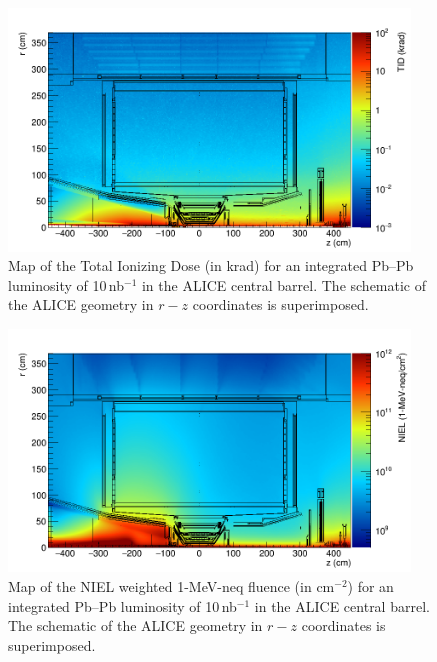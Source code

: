 \begin{figure}[t]
\centering
\includegraphics[width=0.95\textwidth]{figures/SensorSimulation/dose2.png}	
\caption{Map of the Total Ionizing Dose (in krad) for an integrated Pb--Pb luminosity of 10\,nb$^{-1}$ in the ALICE central barrel. The schematic of the ALICE geometry in $r-z$ coordinates is superimposed.}
\label{dose} 
\end{figure}

\begin{figure}[H]
\centering
\includegraphics[width=0.95\textwidth]{figures/SensorSimulation/nequ2.png}	
\caption{Map of the NIEL weighted 1-MeV-neq fluence (in cm$^{-2}$) for an integrated Pb--Pb luminosity of 10\,nb$^{-1}$ in the ALICE central barrel. The schematic of the ALICE geometry in $r-z$ coordinates is superimposed.}
\label{neq} 
\end{figure}

